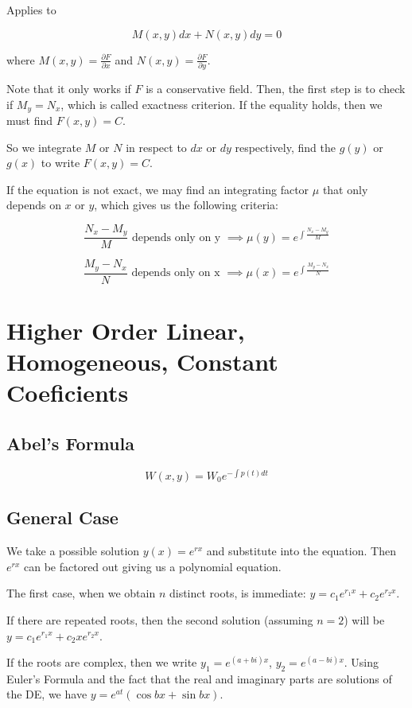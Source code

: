 \documentclass[12pt,a4paper]{article}
\begin{document}
Applies to

\[
M(x,y)dx+N(x,y)dy=0
\]

where $M(x,y)=\frac{\partial F}{\partial x}$ and $N(x,y)=\frac{\partial F}{\partial y}$. 

Note that it only works if $F$ is a conservative field. Then, the first step is to check if $M_y = N_x$, which is called exactness criterion. If the equality holds, then we must find $F(x,y)=C$.

So we integrate $M$ or $N$ in respect to $dx$ or $dy$ respectively, find the $g(y)$ or $g(x)$ to write $F(x,y)=C$.

If the equation is not exact, we may find an integrating factor $\mu$ that only depends on $x$ or $y$, which gives us the following criteria:

\[
\frac{N_x - M_y}{M} \text{ depends only on y } \implies \mu(y) = e^{\int \frac{N_x - M_y}{M}}
\]

\[
\frac{M_y - N_x}{N} \text{ depends only on x } \implies \mu(x) = e^{\int \frac{M_y - N_x}{N}}
\]

\section{Higher Order Linear, Homogeneous, Constant Coeficients}\label{higher-order-linear-homogeneous-constant-coeficients}

\subsection{Abel's Formula}

\[
W(x,y) = W_0 e^{- \int p(t)dt}
\]

\subsection{General Case}

We take a possible solution $y(x)=e^{rx}$ and substitute into the equation. Then $e^{rx}$ can be factored out giving us a polynomial equation.

The first case, when we obtain $n$ distinct roots, is immediate: $y = c_1e^{r_1x} + c_2e^{r_2x}$.

If there are repeated roots, then the second solution (assuming $n=2$) will be $y = c_1e^{r_1x} + c_2xe^{r_2x}$.

If the roots are complex, then we write $y_1 = e^{(a+bi)x}$, $y_2 = e^{(a-bi)x}$. Using Euler's Formula and the fact that the real and imaginary parts are solutions of the DE, we have $y=e^{at}(\cos{bx}+\sin{bx})$.
\end{document}
